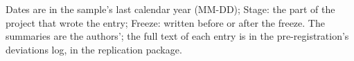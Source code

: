 \endgroup
\vspace{-0.5\baselineskip}
{\footnotesize\raggedright
Dates are in the sample's last calendar year (MM-DD); Stage: the part of the project that wrote the entry; Freeze: written before or after the freeze. The summaries are the authors'; the full text of each entry is in the pre-registration's deviations log, in the replication package.\par
}
